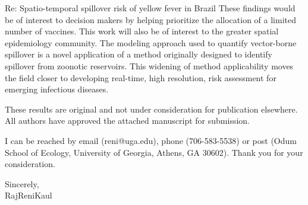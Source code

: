 \documentclass{letter}
\begin{document}
\begin{letter} {Re:  Spatio-temporal spillover risk of yellow fever in Brazil}
These findings would be of interest to decision makers by helping prioritize the allocation of a limited number of vaccines. This work will also be of interest to the greater spatial epidemiology community. The modeling approach used to quantify vector-borne spillover is a novel application of a method originally designed to identify spillover from zoonotic reservoirs. This widening of method applicability moves the field closer to developing real-time, high resolution, risk assessment for emerging infectious diseases. 


These results are original and not under consideration for publication elsewhere.  All authors have approved the attached manuscript for submission. 

I can be reached by email (reni@uga.edu), phone (706-583-5538) or post (Odum School of Ecology, University of Georgia, Athens, GA 30602). Thank you for your consideration.

Sincerely,\\

RajReniKaul


\end{letter}
\end{document}
